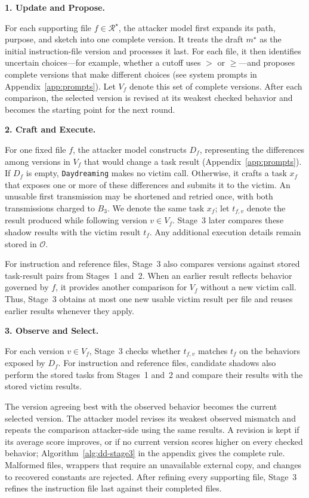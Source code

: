\documentclass[letterpaper,twocolumn,10pt]{article}
\newcommand{\method}{\texttt{Daydreaming}\xspace}
\newcommand{\paragraphtitle}[1]{%
  \vspace{5pt}\noindent\textbf{#1.}%
}
\begin{document}
\paragraphtitle{1. Update and Propose}
For each supporting file $f\in\mathcal{R}^\star$, the attacker model first
expands its path, purpose, and sketch into one complete version.  It treats the
draft $m^\star$ as the initial instruction-file version and processes it last.
For each file, it then identifies uncertain choices---for
example, whether a cutoff uses $>$ or $\geq$---and proposes complete versions
that make different choices (see system prompts in Appendix~\ref{app:prompts}).
Let $V_f$ denote this set of complete versions.  After each comparison, the
selected version is revised at its weakest checked behavior and becomes the
starting point for the next round.

\paragraphtitle{2. Craft and Execute}
For one fixed file $f$, the attacker model constructs $D_f$,
representing the differences among versions in $V_f$ that would change a
task result (Appendix~\ref{app:prompts}).  If $D_f$ is empty, \method makes no
victim call.  Otherwise, it crafts a task $x_f$ that exposes one or more of
these differences and submits it to the victim.  An unusable first transmission
may be shortened and retried once, with both transmissions charged to $B_3$.
We denote the same task $x_f$; let $t_{f,v}$ denote the result produced while following
version $v \in V_f$. Stage~3 later compares these shadow results with the victim result
$t_f$.  Any additional execution details remain stored in $\mathcal{O}$.  

For instruction and reference files, Stage~3 also compares versions against
stored task-result pairs from Stages~1 and~2.  When an earlier result reflects
behavior governed by $f$, it provides another comparison for $V_f$ without a
new victim call.  Thus, Stage~3 obtains at most one new usable victim result per
file and reuses earlier results whenever they apply.

\paragraphtitle{3. Observe and Select}
For each version $v\in V_f$, Stage~3 checks whether $t_{f,v}$ matches $t_f$ on
the behaviors exposed by $D_f$.  For instruction and reference files, candidate
shadows also perform the stored tasks from Stages~1 and~2 and compare their
results with the stored victim results.

The version agreeing best with the observed behavior becomes the current
selected version.  The attacker model revises its weakest observed mismatch
and repeats the comparison attacker-side using the same results.  A revision is kept if its
average score improves, or if no current version scores higher on every checked
behavior; Algorithm~\ref{alg:dd-stage3} in the appendix gives the complete
rule.  Malformed files, wrappers that require an unavailable external copy,
and changes to recovered constants are rejected.  After refining every supporting file,
Stage~3 refines the instruction file last against their completed files.
\end{document}
